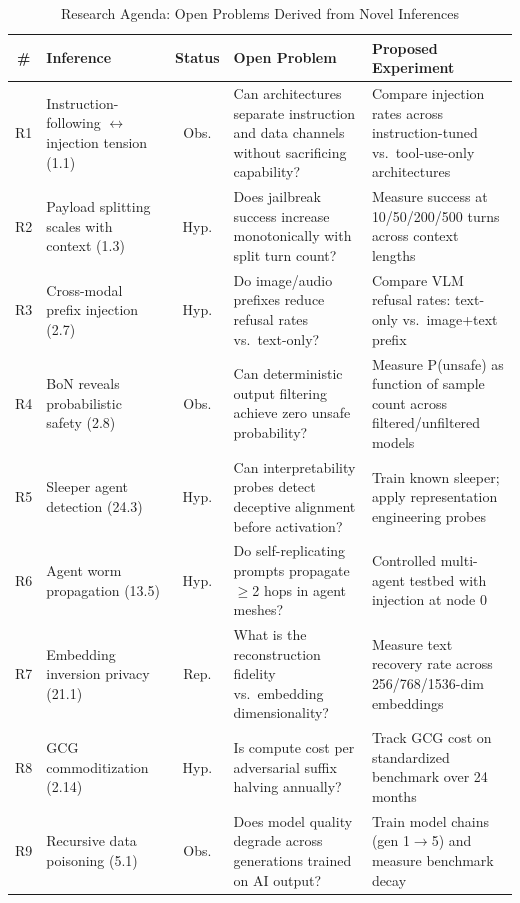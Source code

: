 \documentclass[conference]{IEEEtran}
\newcommand{\tableheaderrow}{\rowcolor{accentblue}}
\renewcommand{\thead}[1]{\textbf{\color{white}\sffamily #1}}
\begin{document}
\begin{table}[!htbp]
\centering
\caption{Research Agenda: Open Problems Derived from Novel Inferences}
\label{tab:research_agenda}
\renewcommand{\arraystretch}{1.15}
\scriptsize\sffamily
\begin{tabular}{cp{2.8cm}cp{4.2cm}p{4.2cm}}
\toprule
\tableheaderrow \thead{\#} & \thead{Inference} & \thead{Status} & \thead{Open Problem} & \thead{Proposed Experiment} \\
\midrule
R1 & Instruction-following $\leftrightarrow$ injection tension (1.1) & Obs. & Can architectures separate instruction and data channels without sacrificing capability? & Compare injection rates across instruction-tuned vs.\ tool-use-only architectures \\
\midrule
R2 & Payload splitting scales with context (1.3) & Hyp. & Does jailbreak success increase monotonically with split turn count? & Measure success at 10/50/200/500 turns across context lengths \\
\midrule
R3 & Cross-modal prefix injection (2.7) & Hyp. & Do image/audio prefixes reduce refusal rates vs.\ text-only? & Compare VLM refusal rates: text-only vs.\ image+text prefix \\
\midrule
R4 & BoN reveals probabilistic safety (2.8) & Obs. & Can deterministic output filtering achieve zero unsafe probability? & Measure P(unsafe) as function of sample count across filtered/unfiltered models \\
\midrule
R5 & Sleeper agent detection (24.3) & Hyp. & Can interpretability probes detect deceptive alignment before activation? & Train known sleeper; apply representation engineering probes \\
\midrule
R6 & Agent worm propagation (13.5) & Hyp. & Do self-replicating prompts propagate $\geq$2 hops in agent meshes? & Controlled multi-agent testbed with injection at node 0 \\
\midrule
R7 & Embedding inversion privacy (21.1) & Rep. & What is the reconstruction fidelity vs.\ embedding dimensionality? & Measure text recovery rate across 256/768/1536-dim embeddings \\
\midrule
R8 & GCG commoditization (2.14) & Hyp. & Is compute cost per adversarial suffix halving annually? & Track GCG cost on standardized benchmark over 24 months \\
\midrule
R9 & Recursive data poisoning (5.1) & Obs. & Does model quality degrade across generations trained on AI output? & Train model chains (gen 1$\rightarrow$5) and measure benchmark decay \\

\end{tabular}
\end{table}
\end{document}
